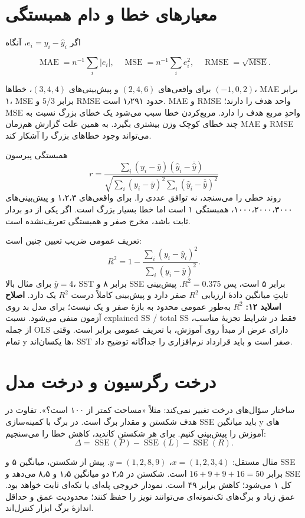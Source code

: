 \documentclass[12pt,a4paper,oneside]{report}
\newcounter{ex}[chapter]
\begin{document}
\section{معیارهای خطا و دام همبستگی}

اگر \(e_i=y_i-\widehat y_i\)، آنگاه

\[
\operatorname{MAE}=n^{-1}\sum_i|e_i|,\quad
\operatorname{MSE}=n^{-1}\sum_i e_i^2,\quad
\operatorname{RMSE}=\sqrt{\operatorname{MSE}}.
\]

برای واقعی‌های \((2,4,6)\) و پیش‌بینی‌های \((3,4,4)\)، خطاها \((-1,0,2)\)، MAE برابر ۱، MSE برابر \(5/3\) و RMSE حدود ۱٫۲۹۱ است. MAE و RMSE واحد هدف را دارند؛ MSE واحدِ مربع هدف را دارد. مربع‌کردن خطا سبب می‌شود یک خطای بزرگ نسبت به چند خطای کوچک وزن بیشتری بگیرد. به همین علت گزارش هم‌زمان MAE و RMSE می‌تواند وجود خطاهای بزرگ را آشکار کند.

همبستگی پیرسون \[
r=\frac{\sum_i(y_i-\bar y)(\widehat y_i-\overline{\widehat y})}{\sqrt{\sum_i(y_i-\bar y)^2\sum_i(\widehat y_i-\overline{\widehat y})^2}}
\] روند خطی را می‌سنجد، نه توافق عددی را. برای واقعی‌های ۱،۲،۳ و پیش‌بینی‌های ۱۰۰۰،۲۰۰۰،۳۰۰۰، همبستگی ۱ است اما خطا بسیار بزرگ است. اگر یکی از دو بردار ثابت باشد، مخرج صفر و همبستگی تعریف‌نشده است.

تعریف عمومی ضریب تعیین چنین است: \[
R^2=1-\frac{\sum_i(y_i-\widehat y_i)^2}{\sum_i(y_i-\bar y)^2}.
\] برای مثال بالا \(\bar y=4\)، SST برابر ۸ و SSE برابر ۵ است، پس \(R^2=0.375\). پیش‌بینی ثابتِ میانگین دادهٔ ارزیابی $R^2$ صفر دارد و پیش‌بینی کاملاً درست $R^2$ یک دارد. \textbf{اصلاح اسلاید ۱۲:} $R^2$ به‌طور عمومی محدود به بازهٔ صفر و یک نیست؛ برای مدل بد روی آزمون منفی می‌شود. نسبت explained SS / total SS فقط در شرایط تجزیهٔ مناسب، از جمله OLS دارای عرض از مبدأ روی آموزش، با تعریف عمومی برابر است. وقتی تمام y ها یکسان‌اند، SST صفر است و باید قرارداد نرم‌افزاری را جداگانه توضیح داد.

\section{درخت رگرسیون و درخت مدل}

ساختار سؤال‌های درخت تغییر نمی‌کند: مثلاً «مساحت کمتر از ۱۰۰ است؟». تفاوت در هدف شکستن و مقدار برگ است. در برگ با کمینه‌سازی SSE باید میانگین y های آموزش را پیش‌بینی کنیم. برای هر شکستنِ کاندید، کاهش خطا را می‌سنجیم: \[
\Delta=\operatorname{SSE}(P)-\operatorname{SSE}(L)-\operatorname{SSE}(R).
\]

مثال مستقل: \(x=(1,2,3,4)\)، \(y=(1,2,8,9)\). پیش از شکستن، میانگین ۵ و SSE برابر \(16+9+9+16=50\) است. شکستن در ۲٫۵ دو میانگین ۱٫۵ و ۸٫۵ می‌دهد و SSE کل ۱ می‌شود؛ کاهش برابر ۴۹ است. نمودار خروجی پله‌ای یا تکه‌ای ثابت خواهد بود. عمق زیاد و برگ‌های تک‌نمونه‌ای می‌توانند نویز را حفظ کنند؛ محدودیت عمق و حداقل اندازهٔ برگ ابزار کنترل‌اند.
\end{document}
